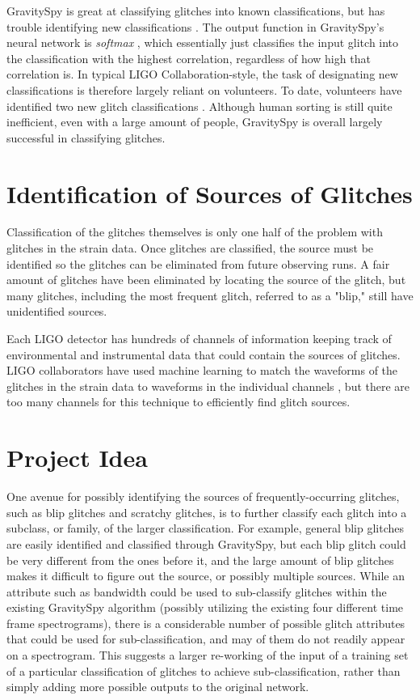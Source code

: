 \documentclass[a4paper]{article}
\begin{document}
GravitySpy is great at classifying glitches into known classifications, but has trouble identifying new classifications \cite{Zevin:2016}. The output function in GravitySpy's neural network is \textit{softmax} \cite{Bahaadini:2017}, which essentially just classifies the input glitch into the classification with the highest correlation, regardless of how high that correlation is. In typical LIGO Collaboration-style, the task of designating new classifications is therefore largely reliant on volunteers. To date, volunteers have identified two new glitch classifications \cite{Zevin:2016}. Although human sorting is still quite inefficient, even with a large amount of people, GravitySpy is overall largely successful in classifying glitches.

\section{Identification of Sources of Glitches}

Classification of the glitches themselves is only one half of the problem with glitches in the strain data. Once glitches are classified, the source must be identified so the glitches can be eliminated from future observing runs. A fair amount of glitches have been eliminated by locating the source of the glitch, but many glitches, including the most frequent glitch, referred to as a "blip," still have unidentified sources.

Each LIGO detector has hundreds of channels of information keeping track of environmental and instrumental data that could contain the sources of glitches. LIGO collaborators have used machine learning to match the waveforms of the glitches in the strain data to waveforms in the individual channels \cite{Zevin:2016}, but there are too many channels for this technique to efficiently find glitch sources.

\section{Project Idea}

One avenue for possibly identifying the sources of frequently-occurring glitches, such as blip glitches and scratchy glitches, is to further classify each glitch into a subclass, or family, of the larger classification. For example, general blip glitches are easily identified and classified through GravitySpy, but each blip glitch could be very different from the ones before it, and the large amount of blip glitches makes it difficult to figure out the source, or possibly multiple sources. While an attribute such as bandwidth could be used to sub-classify glitches within the existing GravitySpy algorithm (possibly utilizing the existing four different time frame spectrograms), there is a considerable number of possible glitch attributes that could be used for sub-classification, and may of them do not readily appear on a spectrogram. This suggests a larger re-working of the input of a training set of a particular classification of glitches to achieve sub-classification, rather than simply adding more possible outputs to the original network.
\end{document}
